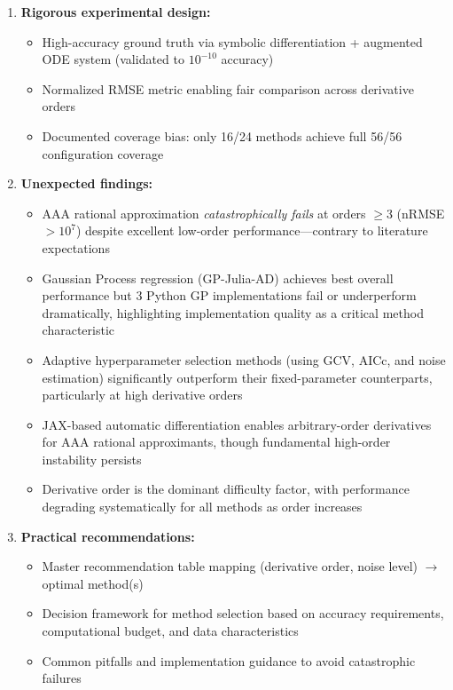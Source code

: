 \begin{enumerate}
    \item \textbf{Rigorous experimental design:} 
    \begin{itemize}
        \item High-accuracy ground truth via symbolic differentiation + augmented ODE system (validated to $10^{-10}$ accuracy)
        \item Normalized RMSE metric enabling fair comparison across derivative orders
        \item Documented coverage bias: only 16/24 methods achieve full 56/56 configuration coverage
    \end{itemize}
    
    \item \textbf{Unexpected findings:}
    \begin{itemize}
        \item AAA rational approximation \textit{catastrophically fails} at orders $\geq 3$ (nRMSE $> 10^7$) despite excellent low-order performance—contrary to literature expectations
        \item Gaussian Process regression (GP-Julia-AD) achieves best overall performance but 3 Python GP implementations fail or underperform dramatically, highlighting implementation quality as a critical method characteristic
        \item Adaptive hyperparameter selection methods (using GCV, AICc, and noise estimation) significantly outperform their fixed-parameter counterparts, particularly at high derivative orders
        \item JAX-based automatic differentiation enables arbitrary-order derivatives for AAA rational approximants, though fundamental high-order instability persists
        \item Derivative order is the dominant difficulty factor, with performance degrading systematically for all methods as order increases
    \end{itemize}
    
    \item \textbf{Practical recommendations:}
    \begin{itemize}
        \item Master recommendation table mapping (derivative order, noise level) $\to$ optimal method(s)
        \item Decision framework for method selection based on accuracy requirements, computational budget, and data characteristics
        \item Common pitfalls and implementation guidance to avoid catastrophic failures
    \end{itemize}
    

\end{enumerate}
